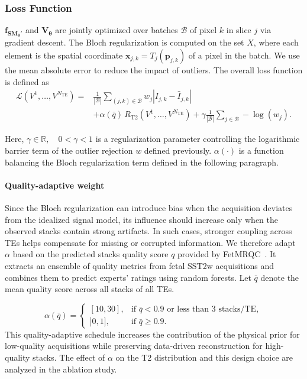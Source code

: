 \documentclass[preprint,authoryear,12pt]{elsarticle}
\begin{document}
\subsubsection{Loss Function}
$\mathbf{f_{{SM}_{\theta}'}}$ and \(\mathbf{V_\theta}\)  are jointly optimized over batches $\mathcal{B}$ of pixel $k$ in slice $j$ via gradient descent. The Bloch regularization is computed on the set $X$, where each element is the spatial coordinate
$\mathbf{x}_{j,k} = T_j(\mathbf{p}_{j,k})$ of a pixel in the batch. We use the mean absolute error to reduce the impact of outliers. The overall loss function is defined as
\begin{equation}
\label{eq:loss_function_sc}
\begin{split}
\mathcal{L}(V^1,\dots,V^{N_{\mathrm{TE}}})
= &
\frac{1}{|\mathcal{B}|}
\sum_{(j,k)\in\mathcal{B}} w_j
\left| I_{j,k} - \hat{I}_{j,k} \right| \\ &+
\alpha(\bar{q})\, R_{\mathrm{T2}}(V^1,\dots,V^{N_{\mathrm{TE}}})
+ \gamma \frac{1}{|\mathcal{B}|} \sum_{j\in\mathcal{B}} -\log(w_j).
\end{split}
\end{equation}

Here, $\gamma \in \mathbb{R}, \quad 0 < \gamma < 1$ is a regularization parameter controlling the logarithmic barrier term of the outlier rejection $w$ defined previously. $\alpha(\cdot)$ is a function balancing the Bloch regularization term defined in the following paragraph.



\paragraph{Quality-adaptive weight} Since the Bloch regularization can introduce bias when the acquisition deviates from the idealized signal model, its influence should increase only when the observed stacks contain strong artifacts. In such cases, stronger coupling across TEs helps compensate for missing or corrupted information. We therefore adapt $\alpha$ based on the predicted stacks quality score $q$ provided by FetMRQC~\citep{sanchez_fetmrqc_2024}. It extracts an ensemble of quality metrics from fetal SST2w acquisitions and combines them to predict experts’ ratings using random forests. Let $\bar{q}$ denote the mean quality score across all stacks of all TEs.

\[
\alpha(\bar{q})=
\begin{cases}
[10,30], & \text{if } \bar{q}<0.9 \text{ or less than 3 stacks/TE},\\
]0,1], & \text{if } \bar{q}\ge 0.9.
\end{cases}
\]
This quality-adaptive schedule increases the contribution of the physical prior for low-quality acquisitions while preserving data-driven reconstruction for high-quality stacks. The effect of $\alpha$ on the T2 distribution and this design choice are analyzed in the ablation study.
\end{document}
